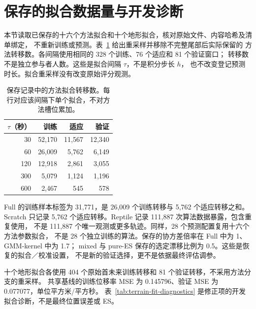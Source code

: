 \section{保存的拟合数据量与开发诊断}
\label{sec:saved-fit-diagnostics}\hypertarget{sec:saved-fit-diagnostics}{}
本节读取已保存的十六个方法拟合和十个地形拟合，核对原始文件、内容哈希及清单绑定，
不重新训练或预测。表~\ref{tab:fit-transition-counts} 给出重采样并移除不完整尾部后实际保留的
方法转移数。各间隔使用相同的 328 个训练、76 个适应和 81 个验证窗口；
转移数不是独立参与者人数。这些是拟合间隔 \(\tau\)，不是积分步长 \(h\)，
也不改变登记预测时长。拟合重采样没有改变原始评分观测。

\begin{table}[htbp]
\centering\small
\caption{保存记录中的方法拟合转移数。每行对应该间隔下单个拟合，不对方法槽位累加。}
\label{tab:fit-transition-counts}\hypertarget{tab:fit-transition-counts}{}
\begin{tabular}{rrrr}
\toprule
\(\tau\)（秒） & 训练 & 适应 & 验证\\
\midrule
30 & 52,170 & 11,567 & 12,340\\
60 & 26,009 & 5,762 & 6,149\\
120 & 12,918 & 2,861 & 3,055\\
300 & 5,079 & 1,124 & 1,196\\
600 & 2,467 & 545 & 578\\
\bottomrule
\end{tabular}
\end{table}

Full 的训练样本标签为 31,771，是 26,009 个训练转移与 5,762 个适应转移之和。
Scratch 只记录 5,762 个适应转移。Reptile 记录 111,887 次算法数据暴露，包含重复使用，
不是 111,887 个唯一观测或更多轨迹。同样，28 个预测配置复用十六个方法参数拟合，
不是 28 个独立训练的算法。保存的协方差倍率在 Full 中为 1、GMM-kernel 中为 1.7；
mixed 与 pure-ES 保存的选定漂移比例为 0.5。这些是恢复的拟合／校准设置，
不是新的验证选择，更不是依据最终评估调参。

十个地形拟合各使用 404 个原始首未来训练转移和 81 个验证转移，不采用方法分支的重采样。
共享基线的训练位移率 MSE 为 0.145796、验证 MSE 为 0.077077，单位平方米/平方秒。
表~\ref{tab:terrain-fit-diagnostics} 是修正项的开发拟合诊断，不是最终位置误差或 ES。


